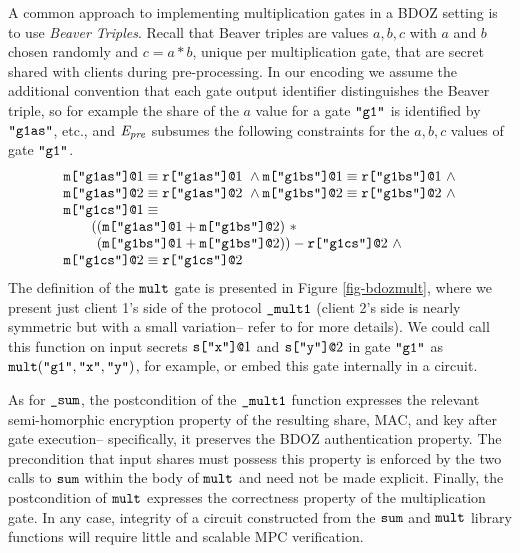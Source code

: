 A common approach to implementing multiplication gates in a BDOZ
setting is to use \emph{Beaver Triples}. Recall that Beaver triples
are values $a,b,c$ with $a$ and $b$ chosen randomly and $c = a * b$,
unique per multiplication gate, that are secret shared with clients
during pre-processing.  In our encoding we assume the additional
convention that each gate output identifier distinguishes the Beaver
triple, so for example the share of the $a$ value for a gate
$\texttt{"g1"}$ is identified by $\texttt{"g1as"}$, etc., and $\mathit{E}_{\mathit{pre}}$
subsumes the following constraints for the $a,b,c$ values of gate
$\texttt{"g1"}$.  {\footnotesize$$
\begin{array}{l}
\texttt{m[}\texttt{"g1as"}\texttt{]}\texttt{@}1 \equiv \texttt{r[}\texttt{"g1as"}\texttt{]}\texttt{@}1\ \wedge 
\texttt{m[}\texttt{"g1bs"}\texttt{]}\texttt{@}1 \equiv \texttt{r[}\texttt{"g1bs"}\texttt{]}\texttt{@}1\ \wedge\\
\texttt{m[}\texttt{"g1as"}\texttt{]}\texttt{@}2 \equiv \texttt{r[}\texttt{"g1as"}\texttt{]}\texttt{@}2\ \wedge 
\texttt{m[}\texttt{"g1bs"}\texttt{]}\texttt{@}2 \equiv \texttt{r[}\texttt{"g1bs"}\texttt{]}\texttt{@}2\ \wedge\\
\texttt{m[}\texttt{"g1cs"}\texttt{]}\texttt{@}1 \equiv \\
\qquad ((\texttt{m[}\texttt{"g1as"}\texttt{]}\texttt{@}1 + \texttt{m[}\texttt{"g1bs"}\texttt{]}\texttt{@}2)\ *\\
\qquad\phantom{(}(\texttt{m[}\texttt{"g1bs"}\texttt{]}\texttt{@}1 + \texttt{m[}\texttt{"g1bs"}\texttt{]}\texttt{@}2)) - \texttt{r[}\texttt{"g1cs"}\texttt{]}\texttt{@}2\ \wedge\\
\texttt{m[}\texttt{"g1cs"}\texttt{]}\texttt{@}2 \equiv \texttt{r[}\texttt{"g1cs"}\texttt{]}\texttt{@}2
\end{array}
$$}
The definition of the $\texttt{mult}$ gate is presented in Figure
\ref{fig-bdozmult}, where we present just client 1's side of the
protocol $\texttt{\_mult1}$ (client 2's side is nearly symmetric but with
a small variation-- refer to
\cite{evans2018pragmatic,10.1007/978-3-030-68869-1_3} for more
details).  We could call this function on input secrets
$\texttt{s[}\texttt{"x"}\texttt{]}\texttt{@}1$ and $\texttt{s[}\texttt{"y"}\texttt{]}\texttt{@}2$ in gate $\texttt{"g1"}$ as
$\texttt{mult}(\texttt{"g1"},\texttt{"x"},\texttt{"y"})$, for example, or embed
this gate internally in a circuit.

As for $\texttt{\_sum}$, the postcondition of the $\texttt{\_mult1}$
function expresses the relevant semi-homorphic encryption property of
the resulting share, MAC, and key after gate execution-- specifically,
it preserves the BDOZ authentication property. The precondition that
input shares must possess this property is enforced by the two calls
to $\texttt{sum}$ within the body of $\texttt{mult}$ and need not be made
explicit. Finally, the postcondition of $\texttt{mult}$ expresses the
correctness property of the multiplication gate. In any case,
integrity of a circuit constructed from the $\texttt{sum}$ and
$\texttt{mult}$ library functions will require little and
scalable MPC verification.


